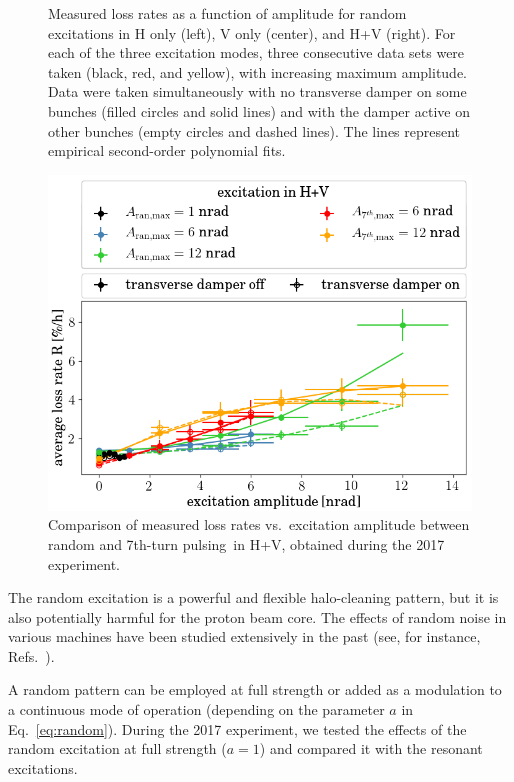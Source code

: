 \documentclass[aps
,prstab
,reprint
,longbibliography
,preprintnumbers
,showkeys
,amsfonts,amssymb,amsmath
,floatfix
]{revtex4-1}
\newcommand{\seventhtp}{7th-turn pulsing}
\begin{document}
\begin{figure}
\begin{tabular}{ccc}
  \end{tabular}
  \caption{Measured loss rates as a function of amplitude for random
    excitations in H only (left), V only (center), and H+V
    (right). For each of the three excitation modes, three consecutive
    data sets were taken (black, red, and yellow), with increasing
    maximum amplitude. Data were taken simultaneously with no
    transverse damper on some bunches (filled circles and solid lines)
    and with the damper active on other bunches (empty circles and
    dashed lines). The lines represent empirical second-order
    polynomial fits.}
  \label{fig:ranexplossplane}
\end{figure}


\begin{figure}
  \centering
  \includegraphics[width=\columnwidth]{2017_scale_amp_7th_ranhv_lblshort.png}
  \caption{Comparison of measured loss rates vs.\ excitation amplitude
    between random and \seventhtp\ in H+V, obtained during the 2017
    experiment.}
  \label{fig:ranexploss}
\end{figure}


The random excitation is a powerful and flexible halo-cleaning
pattern, but it is also potentially harmful for the proton beam
core. The effects of random noise in various machines have been
studied extensively in the past (see, for instance,
Refs.~\cite{noise_lebedev_ssc, noise_alexahin_lhc, noise_2007_ohmi,
  noise_2014_ohmi, md_noise_bbLHC}).

A random pattern can be employed at full strength or added as a
modulation to a continuous mode of operation (depending on the
parameter $a$ in Eq.~\ref{eq:random}). During the 2017 experiment, we
tested the effects of the random excitation at full strength ($a = 1$)
and compared it with the resonant excitations.
\end{document}
